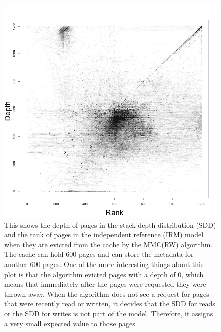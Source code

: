   \begin{figure}
  \centering
  \includegraphics[width=6in]{../media/ev_rw_600_600_2400_2.png}
  \caption[Eviction scatterplot for 1000 page MMC(RW) cache]{This shows the
  depth of pages in the stack depth distribution (SDD) and the rank of pages in
  the independent reference (IRM) model when they are evicted from the cache by
  the MMC(RW) algorithm. The cache can hold 600 pages and can store the
  metadata for another 600 pages. One of the more interesting things about this
  plot is that the algorithm evicted pages with a depth of 0, which means that
  immediately after the pages were requested they were thrown away. When the
  algorithm does not see a request for pages that were recently read or written,
  it decides that the SDD for reads or the SDD for writes is not part of the
  model. Therefore, it assigns a very small expected value to those pages.}
  \label{fig:ev_rw_600_financial1}
  \end{figure}

